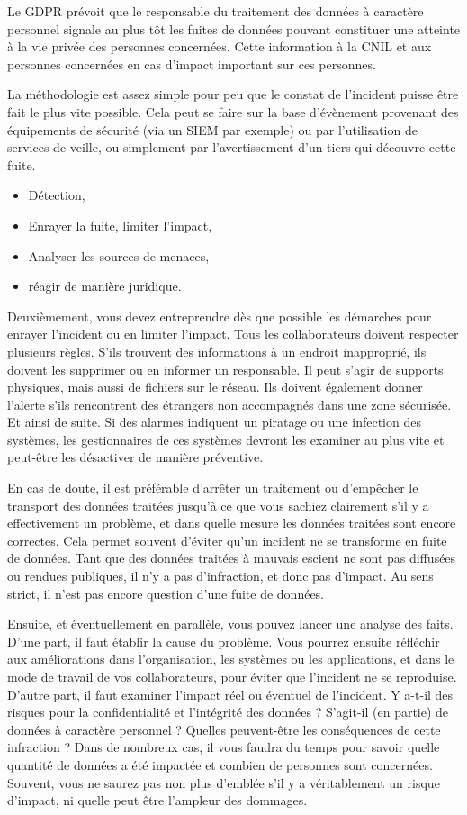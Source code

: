 Le GDPR prévoit que le responsable du traitement des données à caractère personnel signale au plus tôt les fuites de données  pouvant constituer une atteinte à la vie privée des personnes concernées. Cette information à la CNIL et aux personnes concernées en cas d'impact important sur ces personnes.

La méthodologie est assez simple pour peu que le constat de l'incident puisse être fait le plus vite possible. Cela peut se faire sur la base d'évènement provenant des équipements de sécurité (via un SIEM par exemple) ou par l'utilisation de services de veille, ou simplement par l'avertissement d'un tiers qui découvre cette fuite. 

\begin{itemize}
  \item Détection,
  \item Enrayer la fuite, limiter l'impact,
  \item Analyser les sources de menaces,
  \item réagir de manière juridique.
\end{itemize}


Deuxièmement, vous devez entreprendre dès que possible les démarches pour enrayer l’incident ou en limiter l’impact. Tous les collaborateurs doivent respecter plusieurs règles. S’ils trouvent des informations à un endroit inapproprié, ils doivent les supprimer ou en informer un responsable. Il peut s’agir de supports physiques, mais aussi de fichiers sur le réseau. Ils doivent également donner l’alerte s’ils rencontrent des étrangers non accompagnés dans une zone sécurisée. Et ainsi de suite. Si des alarmes indiquent un piratage ou une infection des systèmes, les gestionnaires de ces systèmes devront les examiner au plus vite et peut-être les désactiver de manière préventive.

En cas de doute, il est préférable d’arrêter un traitement ou d’empêcher le transport des données traitées jusqu’à ce que vous sachiez clairement s’il y a effectivement un problème, et dans quelle mesure les données traitées sont encore correctes. Cela permet souvent d’éviter qu’un incident ne se transforme en fuite de données. Tant que des données traitées à mauvais escient ne sont pas diffusées ou rendues publiques, il n’y a pas d’infraction, et donc pas d’impact. Au sens strict, il n’est pas encore question d’une fuite de données.

Ensuite, et éventuellement en parallèle, vous pouvez lancer une analyse des faits. D’une part, il faut établir la cause du problème. Vous pourrez ensuite réfléchir aux améliorations dans l’organisation, les systèmes ou les applications, et dans le mode de travail de vos collaborateurs, pour éviter que l’incident ne se reproduise. D’autre part, il faut examiner l’impact réel ou éventuel de l’incident. Y a-t-il des risques pour la confidentialité et l’intégrité des données ? S’agit-il (en partie) de données à caractère personnel ? Quelles peuvent-être les conséquences de cette infraction ? Dans de nombreux cas, il vous faudra du temps pour savoir quelle quantité de données a été impactée et combien de personnes sont concernées. Souvent, vous ne saurez pas non plus d’emblée s’il y a véritablement un risque d’impact, ni quelle peut être l’ampleur des dommages.

